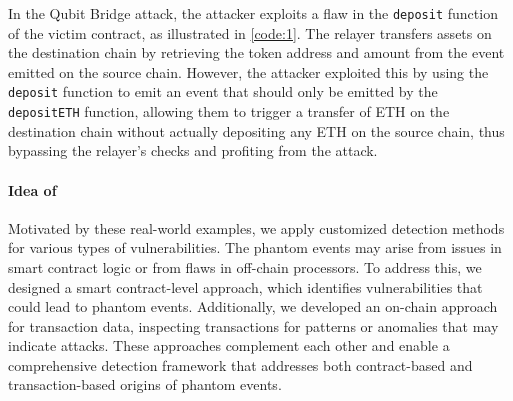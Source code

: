In the Qubit Bridge attack, the attacker exploits a flaw in the \texttt{deposit} function of the
victim contract, as illustrated in \cref{code:1}.
The relayer transfers assets on the destination chain by retrieving the token address and amount
from the event emitted on the source chain. However, the attacker exploited this by using the
\texttt{deposit} function to emit an event that should only be emitted by the \texttt{depositETH}
function, allowing them to trigger a transfer of ETH on the destination chain without actually
depositing any ETH on the source chain, thus bypassing the relayer's checks and profiting from the
attack.


\begin{comment}
Another example is the transfer spoofing attack on 9 February 2024, where an attacker successfully executed a \textit{transfer event spoofing} attack, resulting in a loss of \$1.04 million USD. This attack exploited vulnerabilities in wallets and blockchain explorers that parse and display transfer events. As shown in~\Cref{tab:transfer_spoof_attack_transaction}, after a user sent funds to a legitimate address (0x734\ldots{}a79F7), the attacker forged a transfer event, making it appear as though the funds were sent to a similar address controlled by the attacker. Due to the way certain wallets and explorers processed these events, the fake transfer was displayed as legitimate, leading the user to mistakenly send additional funds to the attacker's address, resulting in significant financial losses~\cite{zero_transfer}.
\end{comment}
\paragraph{Idea of \tool}
Motivated by these real-world examples, we apply customized detection methods for various types of
vulnerabilities.
The phantom events may arise from issues in smart contract logic or from flaws in off-chain
processors.
To address this, we designed a smart contract-level approach, which identifies vulnerabilities that
could lead to phantom events.
Additionally, we developed an on-chain approach for transaction data, inspecting transactions for
patterns or anomalies that may indicate attacks.
These approaches complement each other and enable a comprehensive detection framework that
addresses both contract-based and transaction-based origins of phantom events.